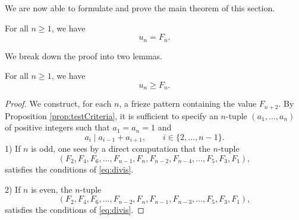 We are now able to formulate and prove the main theorem of this section.
\begin{theorem}
    \label{mainTheorem}
    For all $n \geq 1$, we have 
    \[
        u_n = F_{n}.
    \]    
\end{theorem}
We break down the proof into two lemmas. 

\begin{lemma}
    \label{l:unLB}
    For all $n \geq 1$, we have 
    \[
        u_n \geq F_{n}.
    \]
\end{lemma}
\begin{proof}
    We construct, for each $n$, a frieze pattern containing the value $F_{n+2}$. By Proposition \ref{prop:testCriteria}, 
    it is sufficient to specify an $n$-tuple $(a_1, \ldots, a_n)$ of positive integers such that $a_1 = a_n =1$ and 
    \begin{equation}\label{eq:divis}
        a_i \mid a_{i-1} + a_{i+1}, \qquad i \in \{2, \ldots, n-1\}.
    \end{equation}
    1) If $n$ is odd, one sees by a direct computation that the $n$-tuple 
    \[
        (F_2,F_4, F_6, \ldots, F_{n-1}, F_{n}, F_{n-2}, F_{n-4}, \ldots, F_5, F_3, F_1), 
    \]
    satisfies the conditions of \eqref{eq:divis}. 

    2) If $n$ is even, the $n$-tuple 
    \[
        (F_2, F_4, F_6, \ldots, F_{n-2}, F_{n}, F_{n-1}, F_{n-3}, \ldots, F_5, F_3,F_1),
    \]
    satisfies the conditions of \eqref{eq:divis}. 
\end{proof}





